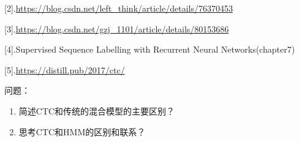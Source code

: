 \documentclass[]{book}
\theoremstyle{definition}
\theoremstyle{definition}
\theoremstyle{definition}
\theoremstyle{remark}
\begin{document}
{[}2{]}.\url{https://blog.csdn.net/left_think/article/details/76370453}

{[}3{]}.\url{https://blog.csdn.net/gzj_1101/article/details/80153686}

{[}4{]}.Supervised Sequence Labelling with Recurrent Neural
Networks(chapter7)

{[}5{]}.\url{https://distill.pub/2017/ctc/}

问题：

\begin{enumerate}
\def\labelenumi{\arabic{enumi}.}
\item
  简述CTC和传统的混合模型的主要区别？
\item
  思考CTC和HMM的区别和联系？
\end{enumerate}


\end{document}

